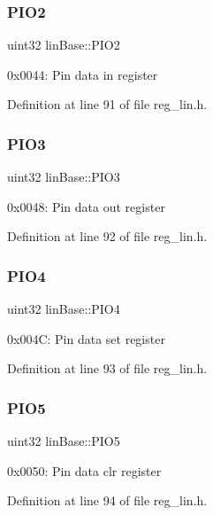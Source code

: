 \subsubsection{\texorpdfstring{P\+I\+O2}{PIO2}}
{\footnotesize\ttfamily uint32 lin\+Base\+::\+P\+I\+O2}

0x0044\+: Pin data in register 

Definition at line 91 of file reg\+\_\+lin.\+h.

\mbox{\label{structlinBase_a8f99320916cab1b4bc7c8f55c6a349c4}} 
\subsubsection{\texorpdfstring{P\+I\+O3}{PIO3}}
{\footnotesize\ttfamily uint32 lin\+Base\+::\+P\+I\+O3}

0x0048\+: Pin data out register 

Definition at line 92 of file reg\+\_\+lin.\+h.

\mbox{\label{structlinBase_a222e2dd99a82ee77b23941280cf59b12}} 
\subsubsection{\texorpdfstring{P\+I\+O4}{PIO4}}
{\footnotesize\ttfamily uint32 lin\+Base\+::\+P\+I\+O4}

0x004C\+: Pin data set register 

Definition at line 93 of file reg\+\_\+lin.\+h.

\mbox{\label{structlinBase_a633a364e06fc1fe0778a099157b0a1a1}} 
\subsubsection{\texorpdfstring{P\+I\+O5}{PIO5}}
{\footnotesize\ttfamily uint32 lin\+Base\+::\+P\+I\+O5}

0x0050\+: Pin data clr register 

Definition at line 94 of file reg\+\_\+lin.\+h.

\mbox{\label{structlinBase_a90597761ab9d0d633a76279cba33a95c}} 

